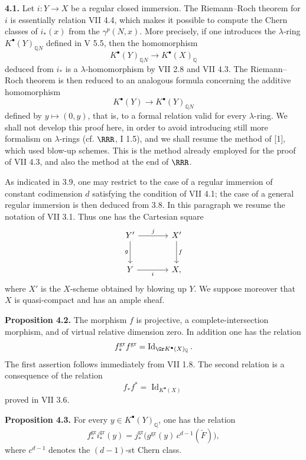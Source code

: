 \textbf{4.1.} Let \(i:Y\to X\) be a regular closed immersion. The Riemann--Roch theorem for \(i\) is essentially relation VII 4.4, which makes it possible to compute the Chern classes of \(i_*(x)\) from the \(\gamma^p(N,x)\). More precisely, if one introduces the \(\lambda\)-ring \(K^{\bullet}(Y)_{\mathbb Q N}\) defined in V 5.5, then the homomorphism
\[
K^{\bullet}(Y)_{\mathbb Q N}\longrightarrow K^{\bullet}(X)_{\mathbb Q}
\]
deduced from \(i_*\) is a \(\lambda\)-homomorphism by VII 2.8 and VII 4.3. The Riemann--Roch theorem is then reduced to an analogous formula concerning the additive homomorphism
\[
K^{\bullet}(Y)\longrightarrow K^{\bullet}(Y)_{\mathbb Q N}
\]
defined by \(y\mapsto(0,y)\), that is, to a formal relation valid for every \(\lambda\)-ring. We shall not develop this proof here, in order to avoid introducing still more formalism on \(\lambda\)-rings (cf. \(\RRR\), I 1.5), and we shall resume the method of [1], which used blow-up schemes. This is the method already employed for the proof of VII 4.3, and also the method at the end of \(\RRR\).

As indicated in 3.9, one may restrict to the case of a regular immersion of constant codimension \(d\) satisfying the condition of VII 4.1; the case of a general regular immersion is then deduced from 3.8. In this paragraph we resume the notation of VII 3.1. Thus one has the Cartesian square
\[
\begin{tikzcd}[column sep=large,row sep=large]
Y' \arrow[r,"j"] \arrow[d,"g"'] & X' \arrow[d,"f"]\\
Y \arrow[r,"i"'] & X ,
\end{tikzcd}
\]
where \(X'\) is the \(X\)-scheme obtained by blowing up \(Y\). We suppose moreover that \(X\) is quasi-compact and has an ample sheaf.

\textbf{Proposition 4.2.} The morphism \(f\) is projective, a complete-intersection morphism, and of virtual relative dimension zero. In addition one has the relation
\[
 f^{\mathrm{gr}}_* f^{\mathrm{gr}}=\operatorname{Id}_{\Gr K^{\bullet}(X)_{\mathbb Q}} .
\]
The first assertion follows immediately from VII 1.8. The second relation is a consequence of the relation
\[
 f_*f^*=\operatorname{Id}_{K^{\bullet}(X)}
\]
proved in VII 3.6.

\textbf{Proposition 4.3.} For every \(y\in K^{\bullet}(Y)_{\mathbb Q}\), one has the relation
\[
 f^{\mathrm{gr}}_* i^{\mathrm{gr}}_*(y)
 =
 j^{\mathrm{gr}}_*\bigl(g^{\mathrm{gr}}(y)\,c^{d-1}(\check F)\bigr),
\]
where \(c^{d-1}\) denotes the \((d-1)\)-st Chern class.

